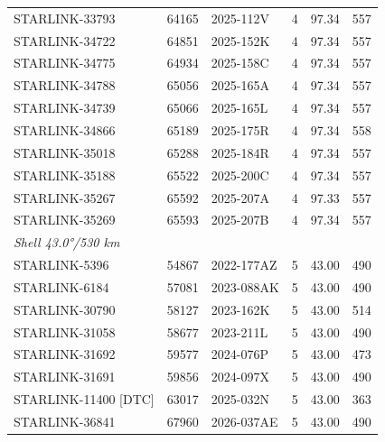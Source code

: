 \begin{longtable}{lllccc}
STARLINK-33793 & 64165 & 2025-112V & 4 & 97.34 & 557 \\
STARLINK-34722 & 64851 & 2025-152K & 4 & 97.34 & 557 \\
STARLINK-34775 & 64934 & 2025-158C & 4 & 97.34 & 557 \\
STARLINK-34788 & 65056 & 2025-165A & 4 & 97.34 & 557 \\
STARLINK-34739 & 65066 & 2025-165L & 4 & 97.34 & 557 \\
STARLINK-34866 & 65189 & 2025-175R & 4 & 97.34 & 558 \\
STARLINK-35018 & 65288 & 2025-184R & 4 & 97.34 & 557 \\
STARLINK-35188 & 65522 & 2025-200C & 4 & 97.34 & 557 \\
STARLINK-35267 & 65592 & 2025-207A & 4 & 97.33 & 557 \\
STARLINK-35269 & 65593 & 2025-207B & 4 & 97.34 & 557 \\
\midrule
\multicolumn{6}{l}{\textit{Shell 43.0°/530 km}} \\
STARLINK-5396 & 54867 & 2022-177AZ & 5 & 43.00 & 490 \\
STARLINK-6184 & 57081 & 2023-088AK & 5 & 43.00 & 490 \\
STARLINK-30790 & 58127 & 2023-162K & 5 & 43.00 & 514 \\
STARLINK-31058 & 58677 & 2023-211L & 5 & 43.00 & 490 \\
STARLINK-31692 & 59577 & 2024-076P & 5 & 43.00 & 473 \\
STARLINK-31691 & 59856 & 2024-097X & 5 & 43.00 & 490 \\
STARLINK-11400 [DTC] & 63017 & 2025-032N & 5 & 43.00 & 363 \\
STARLINK-36841 & 67960 & 2026-037AE & 5 & 43.00 & 490 \\
\end{longtable}

